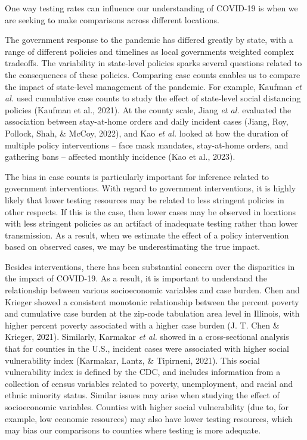 \documentclass[12pt,twoside]{smiththesis}
\begin{document}
One way testing rates can influence our understanding of COVID-19 is when we are seeking to make comparisons across different locations.

The government response to the pandemic has differed greatly by state, with a range of different policies and timelines as local governments weighted complex tradeoffs. The variability in state-level policies sparks several questions related to the consequences of these policies. Comparing case counts enables us to compare the impact of state-level management of the pandemic. For example, Kaufman \emph{et al.} used cumulative case counts to study the effect of state-level social distancing policies (Kaufman et al., 2021). At the county scale, Jiang \emph{et al.} evaluated the association between stay-at-home orders and daily incident cases (Jiang, Roy, Pollock, Shah, \& McCoy, 2022), and Kao \emph{et al.} looked at how the duration of multiple policy interventions -- face mask mandates, stay-at-home orders, and gathering bans -- affected monthly incidence (Kao et al., 2023).

The bias in case counts is particularly important for inference related to government interventions. With regard to government interventions, it is highly likely that lower testing resources may be related to less stringent policies in other respects. If this is the case, then lower cases may be observed in locations with less stringent policies as an artifact of inadequate testing rather than lower transmission. As a result, when we estimate the effect of a policy intervention based on observed cases, we may be underestimating the true impact.

Besides interventions, there has been substantial concern over the disparities in the impact of COVID-19. As a result, it is important to understand the relationship between various socioeconomic variables and case burden. Chen and Krieger showed a consistent monotonic relationship between the percent poverty and cumulative case burden at the zip-code tabulation area level in Illinois, with higher percent poverty associated with a higher case burden (J. T. Chen \& Krieger, 2021). Similarly, Karmakar \emph{et al.} showed in a cross-sectional analysis that for counties in the U.S., incident cases were associated with higher social vulnerability index (Karmakar, Lantz, \& Tipirneni, 2021). This social vulnerability index is defined by the CDC, and includes information from a collection of census variables related to poverty, unemployment, and racial and ethnic minority status.
Similar issues may arise when studying the effect of socioeconomic variables. Counties with higher social vulnerability (due to, for example, low economic resources) may also have lower testing resources, which may bias our comparisons to counties where testing is more adequate.
\end{document}
